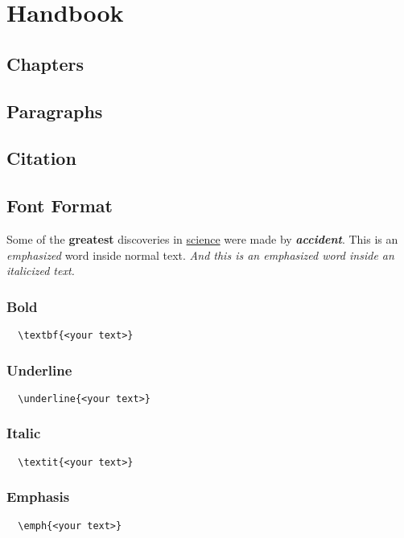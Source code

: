 \chapter{Handbook}
 
\section{Chapters}

\section{Paragraphs}

\section{Citation}

\section{Font Format}
 
Some of the \textbf{greatest} discoveries in \underline{science} were made by \textbf{\textit{accident}}. This is an \emph{emphasized} word inside normal text. \textit{And this is an \emph{emphasized} word inside an italicized text.}

\subsection{Bold}
\begin{lstlisting}
  \textbf{<your text>}
\end{lstlisting}

\subsection{Underline}
\begin{lstlisting}
  \underline{<your text>}
\end{lstlisting}

\subsection{Italic}
\begin{lstlisting}
  \textit{<your text>}
\end{lstlisting}

\subsection{Emphasis}
\begin{lstlisting}
  \emph{<your text>}
\end{lstlisting}
 

